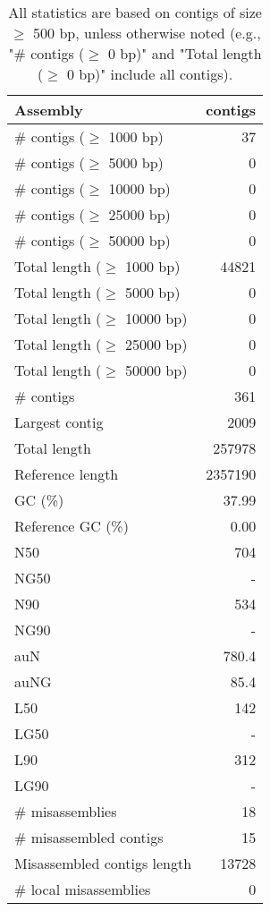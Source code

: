 \documentclass[12pt,a4paper]{article}
\begin{document}
\begin{table}[ht]
\begin{center}
\caption{All statistics are based on contigs of size $\geq$ 500 bp, unless otherwise noted (e.g., "\# contigs ($\geq$ 0 bp)" and "Total length ($\geq$ 0 bp)" include all contigs).}
\begin{tabular}{|l*{1}{|r}|}
\hline
Assembly & contigs \\ \hline
\# contigs ($\geq$ 1000 bp) & 37 \\ \hline
\# contigs ($\geq$ 5000 bp) & 0 \\ \hline
\# contigs ($\geq$ 10000 bp) & 0 \\ \hline
\# contigs ($\geq$ 25000 bp) & 0 \\ \hline
\# contigs ($\geq$ 50000 bp) & 0 \\ \hline
Total length ($\geq$ 1000 bp) & 44821 \\ \hline
Total length ($\geq$ 5000 bp) & 0 \\ \hline
Total length ($\geq$ 10000 bp) & 0 \\ \hline
Total length ($\geq$ 25000 bp) & 0 \\ \hline
Total length ($\geq$ 50000 bp) & 0 \\ \hline
\# contigs & 361 \\ \hline
Largest contig & 2009 \\ \hline
Total length & 257978 \\ \hline
Reference length & 2357190 \\ \hline
GC (\%) & 37.99 \\ \hline
Reference GC (\%) & 0.00 \\ \hline
N50 & 704 \\ \hline
NG50 & - \\ \hline
N90 & 534 \\ \hline
NG90 & - \\ \hline
auN & 780.4 \\ \hline
auNG & 85.4 \\ \hline
L50 & 142 \\ \hline
LG50 & - \\ \hline
L90 & 312 \\ \hline
LG90 & - \\ \hline
\# misassemblies & 18 \\ \hline
\# misassembled contigs & 15 \\ \hline
Misassembled contigs length & 13728 \\ \hline
\# local misassemblies & 0 \\ \hline

\end{tabular}
\end{center}
\end{table}
\end{document}
